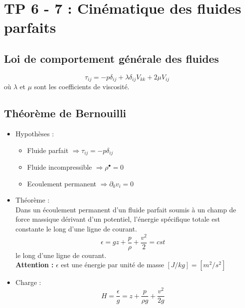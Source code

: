 
\section*{TP 6 - 7 : Cinématique des fluides parfaits}

\subsection*{Loi de comportement générale des fluides}
\begin{equation}
	\tau _{ij} = -p \delta _{ij} +\lambda \delta _{ij} V_ {kk} + 2\mu V_{ij}
\end{equation}
où $\lambda$ et $\mu$ sont les coefficients de viscosité.

\subsection*{Théorème de Bernouilli}
\begin{itemize}
	\item Hypothèses :
	      \begin{itemize}
	      	\item Fluide parfait $\Rightarrow \tau _{ij} = -p \delta _{ij}$
	      	\item Fluide incompressible $\Rightarrow \rho ^{\bullet} = 0$
	      	\item Ecoulement permanent $\Rightarrow \partial _0 v_i = 0$
	      \end{itemize}
	      	
	\item Théorème :\\
	      Dans un écoulement permanent d'un fluide parfait soumis à un champ de force massique dérivant d'un potentiel, l'énergie spécifique totale est constante le long d'une ligne de courant.
	      \begin{equation}
	      	\epsilon = gz + \frac{p}{\rho} + \frac{v^2}{2} = cst
	      \end{equation}
	      le long d'une ligne de courant.\\
	      \textbf{Attention :} $\epsilon$ est une énergie par unité de masse $[J/kg] = [m^2/s^2]$
	      		
	\item Charge :
	      \begin{equation}
	      	H = \frac{\epsilon}{g} = z + \frac{p}{\rho g} + \frac{v^2}{2 g}
	      \end{equation}
\end{itemize}


